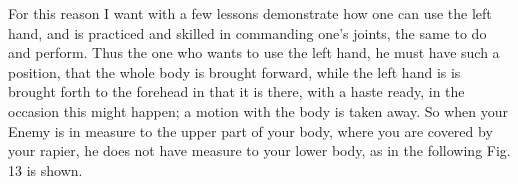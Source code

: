\newpage


\newpage


For this reason I want with a few lessons demonstrate how one can use
the left hand, and is practiced and skilled in commanding one's
joints, the same to do and perform. Thus the one who wants to use the
left hand, he must have such a position, that the whole body is
brought forward, while the left hand is is brought forth to the
forehead in that it is there, with a haste ready, in the occasion this
might happen; a motion with the body is taken away.
So when your Enemy is in measure to the upper part of your body, where
you are covered by your rapier, he does not have measure to your lower
body, as in the following Fig. 13 is shown.
